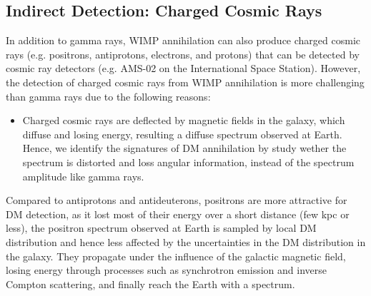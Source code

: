 \subsection{Indirect Detection: Charged Cosmic Rays}
\begin{intuition}
    In addition to gamma rays, WIMP annihilation can also produce charged cosmic rays (e.g. positrons, antiprotons, electrons, and protons) that can be detected by cosmic ray detectors (e.g. AMS-02 on the International Space Station). However, the detection of charged cosmic rays from WIMP annihilation is more challenging than gamma rays due to the following reasons:
    \begin{itemize}
        \item Charged cosmic rays are deflected by magnetic fields in the galaxy, which diffuse and losing energy, resulting a diffuse spectrum observed at Earth. Hence, we identify the signatures of DM annihilation by study wether the spectrum is distorted and loss angular information, instead of the spectrum amplitude like gamma rays. \\
    \end{itemize}
    
    Compared to antiprotons and antideuterons, positrons are more attractive for DM detection, as it lost most of their energy over a short distance (few kpc or less), the positron spectrum observed at Earth is sampled by local DM distribution and hence less affected by the uncertainties in the DM distribution in the galaxy. They propagate under the influence of the galactic magnetic field, losing energy through processes such as synchrotron emission and inverse Compton scattering, and finally reach the Earth with a spectrum.
\end{intuition}

